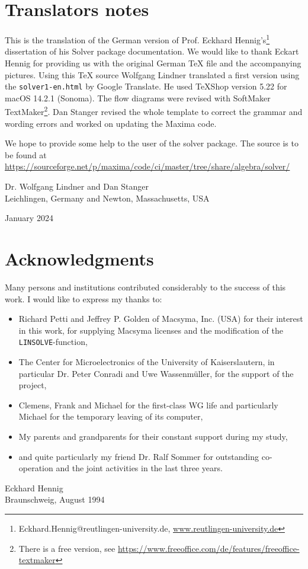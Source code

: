 \documentclass[11pt]{report}           %
\begin{document}
\chapter*{Translators notes}
\thispagestyle{empty}

This is the translation of the German version of Prof. Eckhard {\sc Hennig}'s\footnote{Eckhard.Hennig@reutlingen-university.de, \url{
www.reutlingen-university.de}
} dissertation of his Solver package documentation. 
We would like to thank Eckart Hennig for providing us with the original German TeX file and the accompanying pictures.
Using this TeX source Wolfgang Lindner translated a first version using the {\tt solver1-en.html} by Google Translate. He used  TeXShop version 5.22 for macOS 14.2.1 (Sonoma). The flow diagrams were revised with SoftMaker {\sc TextMaker}\footnote{There is a free version, see \url{https://www.freeoffice.com/de/features/freeoffice-textmaker}}. 
Dan Stanger revised the whole template to correct the grammar and wording errors and worked on updating the Maxima code. 

We hope to provide some help to the user of the solver package.
The source is to be found at 
\url{https://sourceforge.net/p/maxima/code/ci/master/tree/share/algebra/solver/}
 

\vspace{1cm}

\noindent Dr. Wolfgang Lindner  and Dan Stanger  \\
Leichlingen, Germany and Newton, Massachusetts, USA

\noindent January 2024

\cleardoublepage




\chapter*{Acknowledgments}
\thispagestyle{empty}
Many persons and institutions contributed considerably to the success of this work. 
I would like to express my thanks to:
\vspace{1cm}
\begin{itemize}
\item[-] Richard Petti and Jeffrey P. Golden of Macsyma, Inc. (USA) for their interest in this work,
   for supplying Macsyma licenses and the modification of the  \verb+LINSOLVE+-function,
\item[-] The Center for Microelectronics of the University of Kaiserslautern, in particular
   Dr. Peter Conradi and Uwe Wassenm\"uller, for the support of the project,
   
\item[-] Clemens, Frank and Michael for the first-class WG life and particularly Michael for the
   temporary leaving of its computer,
\item[-] My parents and grandparents for their constant support during my study,
\item[-] and quite particularly my friend Dr. Ralf Sommer for outstanding co-operation and the
   joint activities in the last three years.
\end{itemize}
\vspace{1cm}
Eckhard Hennig \\
Braunschweig, August 1994
\end{document}
